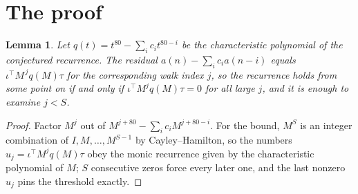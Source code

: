\documentclass[11pt,a4paper]{article}
\theoremstyle{plain}
\newtheorem{lemma}[theorem]{Lemma}
\theoremstyle{definition}
\begin{document}
\section{The proof}

\begin{lemma}\label{lem:crit}
Let $q(t)=t^{80}-\sum_i c_it^{80-i}$ be the characteristic polynomial of the
conjectured recurrence. The residual $a(n)-\sum_ic_ia(n-i)$ equals
$\iota^{\!\top}M^{\,j}q(M)\tau$ for the corresponding walk index $j$, so the recurrence
holds from some point on if and only if $\iota^{\!\top}M^{j}q(M)\tau=0$ for all large $j$,
and it is enough to examine $j<S$.
\end{lemma}

\begin{proof}
Factor $M^{j}$ out of $M^{j+80}-\sum_ic_iM^{j+80-i}$. For the bound, $M^{S}$
is an integer combination of $I,M,\dots,M^{S-1}$ by Cayley--Hamilton, so the numbers
$u_j=\iota^{\!\top}M^{j}q(M)\tau$ obey the monic recurrence given by the characteristic
polynomial of $M$; $S$ consecutive zeros force every later one, and the last nonzero $u_j$
pins the threshold exactly.
\end{proof}
\end{document}
